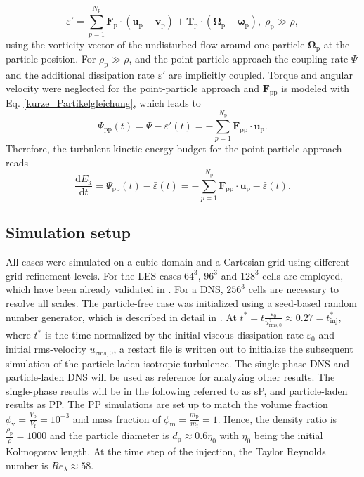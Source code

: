 \documentclass[11pt,a4paper,openany,oneside,parskip=half*]{article}
\renewcommand*\vec[1]{\boldsymbol{#1}}
\begin{document}
\begin{equation}
	\varepsilon' = \sum_{p=1}^{N_\mathrm{p}} \vec{F}_\mathrm{p} \cdot (\vec{u}_\mathrm{p}-\vec{v}_\mathrm{p})+ \vec{T}_\mathrm{p} \cdot (\vec{\Omega}_\mathrm{p} - \vec{\omega}_\mathrm{p}), \; \rho_\mathrm{p} \gg \rho,
\end{equation}
using the vorticity vector of the undisturbed flow around one particle $\vec{\Omega}_\mathrm{p}$ at the particle position.
\newline
For $\rho_\mathrm{p} \gg \rho$, and the point-particle approach the coupling rate $\Psi$ and the additional dissipation rate $\varepsilon'$ are implicitly coupled. Torque and angular velocity were neglected for the point-particle approach and $\vec{F_\mathrm{pp}}$ is modeled with Eq. \ref{kurze_Partikelgleichung}, which leads to
\begin{equation}
\Psi_\mathrm{pp} (t) = \Psi - \varepsilon'(t) = - \sum_{p=1}^{N_\mathrm{p}} \vec{F}_\mathrm{pp} \cdot \vec{u}_\mathrm{p}.
\end{equation}
Therefore, the turbulent kinetic energy budget for the point-particle approach reads
\begin{equation}
\frac{\mathrm{d} E_\mathrm{k}}{\mathrm{d} t} = \Psi_\mathrm{pp} (t) - \bar{\varepsilon} (t) = - \sum_{p=1}^{N_\mathrm{p}} \vec{F}_\mathrm{pp} \cdot \vec{u}_\mathrm{p} - \bar{\varepsilon} (t).
\end{equation}
\newline
\subsection{Simulation setup}
All cases were simulated on a cubic domain and a Cartesian grid using different grid refinement levels. For the LES cases $64^3$, $96^3$ and $128^3$ cells are employed, which have been already validated in \cite{ValidationOfParticleLadenLargeEddySimulationUsingHPCSystems}. For a DNS, $256^3$ cells are necessary to resolve all scales.
\newline
The particle-free case was initialized using a seed-based random number generator, which is described in detail in \cite{orszag1969numerical}. At $t^*=t\frac{\varepsilon_\mathrm{0}}{u_\mathrm{rms,0}^2} \approx 0.27=t_\mathrm{inj}^*$, where $t^*$ is the time normalized by the initial viscous dissipation rate $\varepsilon_\mathrm{0}$ and initial rms-velocity $u_\mathrm{rms,0}$, a restart file is written out to initialize the subsequent simulation of the particle-laden isotropic turbulence.
\newline
The single-phase DNS and particle-laden DNS will be used as reference for analyzing other results. The single-phase results will be in the following referred to as sP, and particle-laden results as PP. The PP simulations are set up to match the volume fraction $\phi_\mathrm{v}=\frac{V_\mathrm{p}}{V_\mathrm{f}}= 10^{-3}$ and mass fraction of $\phi_\mathrm{m}=\frac{m_\mathrm{p}}{m_\mathrm{f}}=1$. Hence, the density ratio is $\frac{\rho_\mathrm{p}}{\rho} = 1000$ and the particle diameter is $d_\mathrm{p} \approx 0.6 \eta_\mathrm{0}$ with $\eta_\mathrm{0}$ being the initial Kolmogorov length. At the time step of the injection, the Taylor Reynolds number is $Re_\lambda \approx 58$. 
\newline
\end{document}
